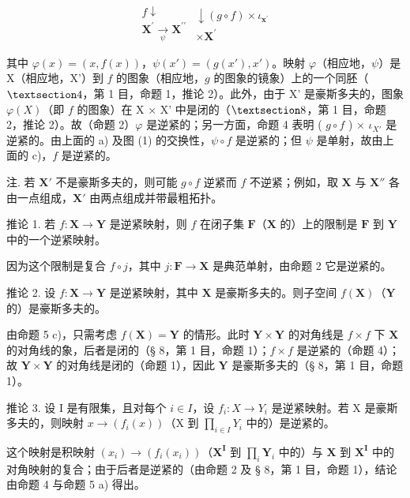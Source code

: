 \[
\begin{array}{c} f \downarrow \\ \mathbf {X} ^ {\prime} \xrightarrow [ \psi ]{} \mathbf {X} ^ {\prime \prime} \end{array} \begin{array}{c} \downarrow (g \circ f) \times \iota_ {\mathbf {x} ^ {\prime}} \\ \times \mathbf {X} ^ {\prime} \end{array}
\]

其中 \(\varphi(x) = (x, f(x))\)，\(\psi(x') = (g(x'), x')\)。映射 \(\varphi\)（相应地，\(\psi\)）是 X（相应地，X'）到 \(f\) 的图象（相应地，\(g\) 的图象的镜象）上的一个同胚（\(\S 4\)，第 1 目，命题 1，推论 2）。此外，由于 X' 是豪斯多夫的，图象 \(\varphi(X)\)（即 \(f\) 的图象）在 X × X' 中是闭的（\(\S 8\)，第 1 目，命题 2，推论 2）。故（命题 2）\(\varphi\) 是逆紧的；另一方面，命题 4 表明 ( \(g \circ f\) ) × \(\iota_{X'}\) 是逆紧的。由上面的 a) 及图 (1) 的交换性，\(\psi \circ f\) 是逆紧的；但 \(\psi\) 是单射，故由上面的 c)，\(f\) 是逆紧的。

注. 若 \(\mathbf{X}'\) 不是豪斯多夫的，则可能 \(g \circ f\) 逆紧而 \(f\) 不逆紧；例如，取 \(\mathbf{X}\) 与 \(\mathbf{X}''\) 各由一点组成，\(\mathbf{X}'\) 由两点组成并带最粗拓扑。

推论 1. 若 \(f: \mathbf{X} \to \mathbf{Y}\) 是逆紧映射，则 \(f\) 在闭子集 \(\mathbf{F}\)（\(\mathbf{X}\) 的）上的限制是 \(\mathbf{F}\) 到 \(\mathbf{Y}\) 中的一个逆紧映射。

因为这个限制是复合 \(f \circ j\)，其中 \(j: \mathbf{F} \to \mathbf{X}\) 是典范单射，由命题 2 它是逆紧的。

推论 2. 设 \(f: \mathbf{X} \to \mathbf{Y}\) 是逆紧映射，其中 \(\mathbf{X}\) 是豪斯多夫的。则子空间 \(f(\mathbf{X})\)（\(\mathbf{Y}\) 的）是豪斯多夫的。

由命题 5 c)，只需考虑 \(f(\mathbf{X}) = \mathbf{Y}\) 的情形。此时 \(\mathbf{Y} \times \mathbf{Y}\) 的对角线是 \(f \times f\) 下 \(\mathbf{X}\) 的对角线的象，后者是闭的（§ 8，第 1 目，命题 1）；\(f \times f\) 是逆紧的（命题 4）；故 \(\mathbf{Y} \times \mathbf{Y}\) 的对角线是闭的（命题 1），因此 \(\mathbf{Y}\) 是豪斯多夫的（§ 8，第 1 目，命题 1）。

推论 3. 设 I 是有限集，且对每个 \(i \in I\)，设 \(f_i: X \to Y_i\) 是逆紧映射。若 X 是豪斯多夫的，则映射 \(x \to (f_i(x))\)（X 到 \(\prod_{i \in I} Y_i\) 中的）是逆紧的。

这个映射是积映射 \((x_{i})\to (f_{i}(x_{i}))\)（\(\mathbf{X}^{\mathbf{I}}\) 到 \(\prod_{i}\mathbf{Y}_{i}\) 中的）与 \(\mathbf{X}\) 到 \(\mathbf{X}^{\mathbf{I}}\) 中的对角映射的复合；由于后者是逆紧的（由命题 2 及 § 8，第 1 目，命题 1），结论由命题 4 与命题 5 a) 得出。

